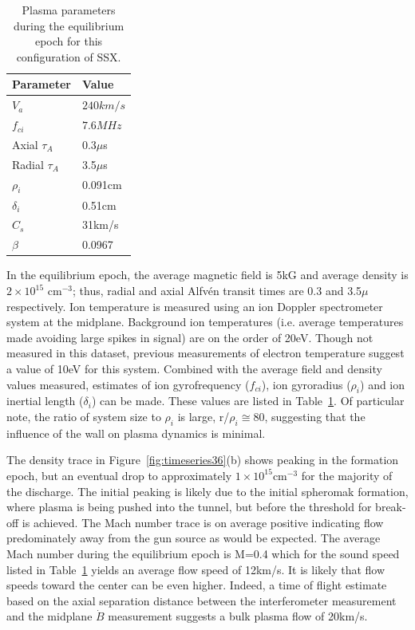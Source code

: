 \documentclass[12pt]{iopart}
\begin{document}
\begin{table}
\caption{\label{tab:params}Plasma parameters during the equilibrium epoch for this configuration of SSX.}
\begin{tabular}{ll}
Parameter&Value\\
\hline
$V_{a}$&$240km/s$\\
$f_{ci}$&$7.6MHz$\\
Axial $\tau_{A}$&0.3$\mu$s\\
Radial $\tau_{A}$&3.5$\mu$s\\
$\rho_{i}$&0.091cm\\
$\delta_{i}$&0.51cm\\
$C_{s}$&31km/s\\
$\beta$&0.0967\\
\end{tabular}
\end{table}

In the equilibrium epoch, the average magnetic field is 5kG and average density is $2\times 10^{15}$ cm$^{-3}$; thus, radial and axial Alfv\'en transit times are 0.3 and 3.5$\mu$ respectively. Ion temperature is measured using an ion Doppler spectrometer system at the midplane. Background ion temperatures (i.e. average temperatures made avoiding large spikes in signal) are on the order of 20eV. Though not measured in this dataset, previous measurements of electron temperature suggest a value of 10eV for this system. Combined with the average field and density values measured, estimates of ion gyrofrequency ($f_{ci}$), ion gyroradius ($\rho_{i}$) and ion inertial length ($\delta_{i}$) can be made. These values are listed in Table~\ref{tab:params}. Of particular note, the ratio of system size to $\rho_{i}$ is large, r/$\rho_{i} \cong 80$, suggesting that the influence of the wall on plasma dynamics is minimal.

The density trace in Figure~\ref{fig:timeseries36}(b) shows peaking in the formation epoch, but an eventual drop to approximately $1\times 10^{15}$cm$^{-3}$ for the majority of the discharge. The initial peaking is likely due to the initial spheromak formation, where plasma is being pushed into the tunnel, but before the threshold for break-off is achieved. The Mach number trace is on average positive indicating flow predominately away from the gun source as would be expected. The average Mach number during the equilibrium epoch is M=0.4 which for the sound speed listed in Table~\ref{tab:params} yields an average flow speed of 12km/s. It is likely that flow speeds toward the center can be even higher. Indeed, a time of flight estimate based on the axial separation distance between the interferometer measurement and the midplane $\dot{B}$ measurement suggests a bulk plasma flow of 20km/s.
\end{document}
